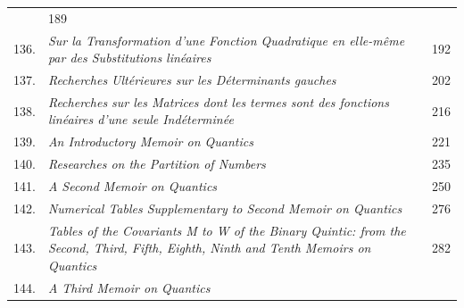 \documentclass[11pt]{article}
\begin{document}
\begin{longtable}{@{}r p{} r@{}}
\hspace{1em}{\footnotesize Crelle, t.\ l.\ (1855), pp.\ 285---287} & 189 \\
136. & \emph{Sur la Transformation d'une Fonction Quadratique en elle-m\^{e}me par des Substitutions lin\'{e}aires} \dotfill \par
\hspace{1em}{\footnotesize Crelle, t.\ l.\ (1855), pp.\ 288---299} & 192 \\
137. & \emph{Recherches Ult\'{e}rieures sur les D\'{e}terminants gauches} \dotfill \par
\hspace{1em}{\footnotesize Crelle, t.\ l.\ (1855), pp.\ 299---313: continuation of 52 and 69} & 202 \\
138. & \emph{Recherches sur les Matrices dont les termes sont des fonctions lin\'{e}aires d'une seule Ind\'{e}termin\'{e}e} \dotfill \par
\hspace{1em}{\footnotesize Crelle, t.\ l.\ (1855), pp.\ 313---317} & 216 \\
139. & \emph{An Introductory Memoir on Quantics} \dotfill \par
\hspace{1em}{\footnotesize Phil.\ Trans.\ t.\ cxliv.\ (for 1854), pp.\ 244---258} & 221 \\
140. & \emph{Researches on the Partition of Numbers} \dotfill \par
\hspace{1em}{\footnotesize Phil.\ Trans.\ t.\ cxlv.\ (for 1855), pp.\ 127---140} & 235 \\
141. & \emph{A Second Memoir on Quantics} \dotfill \par
\hspace{1em}{\footnotesize Phil.\ Trans.\ t.\ cxlvi.\ (for 1856), pp.\ 101---126} & 250 \\
142. & \emph{Numerical Tables Supplementary to Second Memoir on Quantics} \dotfill \par
\hspace{1em}{\footnotesize Now first published (1889)} & 276 \\
143. & \emph{Tables of the Covariants M to W of the Binary Quintic: from the Second, Third, Fifth, Eighth, Ninth and Tenth Memoirs on Quantics} \dotfill \par
\hspace{1em}{\footnotesize Arranged in the present form, 1889} & 282 \\
144. & \emph{A Third Memoir on Quantics} \dotfill \par

\end{longtable}
\end{document}
